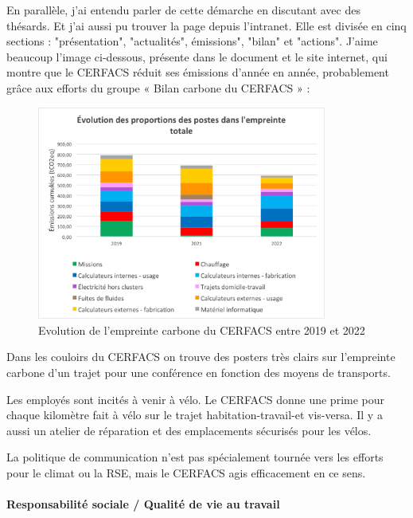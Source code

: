     En parallèle, j'ai entendu parler de cette démarche en discutant avec des thésards. Et j'ai aussi pu trouver la page depuis l'intranet. Elle est divisée en cinq sections : "présentation", "actualités", émissions", "bilan" et "actions".
    J'aime beaucoup l'image ci-dessous, présente dans le document et le site internet, qui montre que le CERFACS réduit ses émissions d'année en année, probablement grâce aux efforts du groupe « Bilan carbone du CERFACS »  : 

    \begin{figure}[H]
        \centering
        \includegraphics[width=0.85\textwidth]{images/evolution_postes_empreintecarbone.png}
        \caption{Evolution de l'empreinte carbone du CERFACS entre 2019 et 2022}
    \end{figure}

    Dans les couloirs du CERFACS on trouve des posters très clairs sur l'empreinte carbone d'un trajet pour une conférence en fonction des moyens de transports.

    Les employés sont incités à venir à vélo. Le CERFACS donne une prime pour chaque kilomètre fait à vélo sur le trajet habitation-travail-et vis-versa. Il y a aussi un atelier de réparation et des emplacements sécurisés pour les vélos.

    La politique de communication n'est pas spécialement tournée vers les efforts pour le climat ou la RSE, mais le CERFACS agis efficacement en ce sens.

\paragraph{Responsabilité sociale / Qualité de vie au travail}
\hspace{0,5cm}


